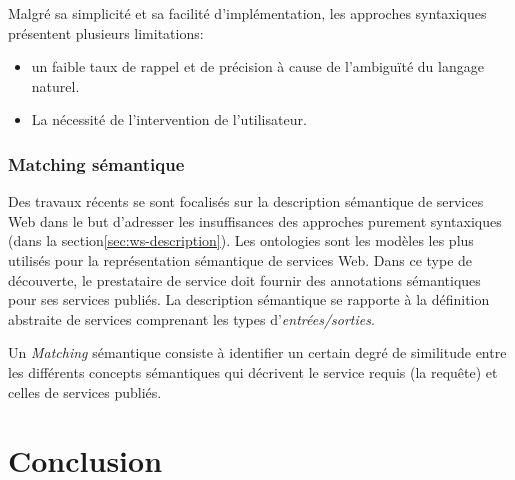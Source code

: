     Malgré sa simplicité et sa facilité d'implémentation, les
    approches syntaxiques présentent plusieurs limitations:\\

    \begin{itemize}
    \item un faible taux de rappel et de précision à cause de
      l'ambiguïté du langage naturel.
    \item La nécessité de l'intervention de l'utilisateur.
    \end{itemize}

    \subsubsection{Matching sémantique}
    \label{sec:matching-semanique}
    Des travaux récents \cite{paolucci2002semantic, keller2004wsmo,
      benatallah2005automating, benatallah2003request, martin2004owl}
    se sont focalisés sur la description sémantique de services Web
    dans le but d'adresser les insuffisances des approches purement
    syntaxiques (dans la section\ref{sec:ws-description}). Les
    ontologies sont les modèles les plus utilisés pour la
    représentation sémantique de services Web. Dans ce type de
    découverte, le prestataire de service doit fournir des annotations
    sémantiques pour ses services publiés. La description sémantique
    se rapporte à la définition abstraite de services comprenant les
    types d'\textit{entrées/sorties}.

    Un \textit{Matching} sémantique consiste à identifier un certain
    degré de similitude entre les différents concepts sémantiques qui
    décrivent le service requis (la requête) et celles de services
    publiés.


\section{Conclusion}


